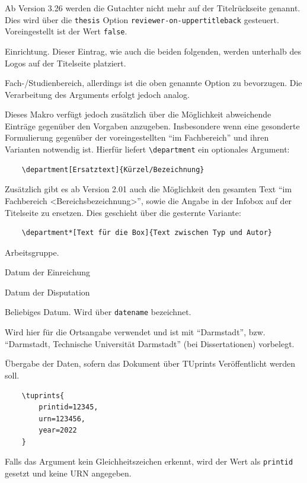 \documentclass[
	ngerman,%
	accentcolor=9c,%
	ruledheaders=section,%
	class=report,%
	thesis={type=bachelor},%
	fontsize=11pt,%
	parskip=half-,%
	custommargins=true,%
	marginpar=false,%
]{tudapub}
\newcommand*{\code}[1]{\texttt{#1}}
\begin{document}
\begin{description}
	      Ab Version 3.26 werden die Gutachter nicht mehr auf der Titelrückseite genannt. Dies wird über die \verb+thesis+ Option \verb+reviewer-on-uppertitleback+ gesteuert. Voreingestellt ist der Wert \verb+false+.
	\item[institution] Einrichtung. Dieser Eintrag, wie auch die beiden folgenden, werden unterhalb des Logos auf der Titelseite platziert.
	\item[department] Fach-/Studienbereich, allerdings ist die oben genannte Option zu bevorzugen. Die Verarbeitung des Arguments erfolgt jedoch analog.

	      Dieses Makro verfügt jedoch zusätzlich über die Möglichkeit abweichende Einträge gegenüber den Vorgaben anzugeben. Insbesondere wenn eine gesonderte Formulierung gegenüber der voreingestellten \enquote{im Fachbereich} und ihren Varianten notwendig ist. Hierfür liefert \code{\textbackslash{}department} ein optionales Argument:

\begin{verbatim}
    \department[Ersatztext]{Kürzel/Bezeichnung}
\end{verbatim}
	      Zusätzlich gibt es ab Version 2.01 auch die Möglichkeit den gesamten Text \enquote{im Fachbereich <Bereichsbezeichnung>}, sowie die Angabe in der Infobox auf der Titelseite zu ersetzen. Dies geschieht über die gesternte Variante:
\begin{verbatim}
    \department*[Text für die Box]{Text zwischen Typ und Autor}
\end{verbatim}
	\item[group] Arbeitsgruppe.
	\item[submissiondate] Datum der Einreichung
	\item[examdate] Datum der Disputation
	\item[date] Beliebiges Datum. Wird über \verb|datename| bezeichnet.
	\item[publishers] Wird hier für die Ortsangabe verwendet und ist mit \enquote{Darmstadt}, bzw. \enquote{Darmstadt, Technische Universität Darmstadt} (bei Dissertationen) vorbelegt.
	\item[tuprints] \label{page:tuprints}Übergabe der Daten, sofern das Dokument über TUprints Veröffentlicht werden soll.
\begin{verbatim}
    \tuprints{
        printid=12345,
        urn=123456,
        year=2022
    }
\end{verbatim}
	      Falls das Argument kein Gleichheitszeichen erkennt, wird der Wert als \code{printid} gesetzt und keine URN angegeben.


\end{description}
\end{document}
